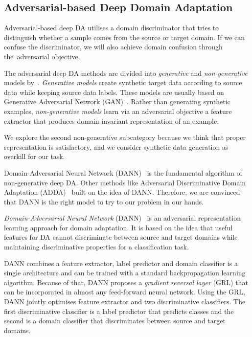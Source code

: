 \subsection{Adversarial-based Deep Domain Adaptation}
\label{adversarial_da}

Adversarial-based deep DA utilises a domain discriminator
that tries to distinguish whether a sample comes from the source or target domain.
If we can confuse the discriminator,
we will also achieve domain confusion through the~adversarial objective.

The adversarial deep DA methods are divided into \textit{generative} and \textit{non-generative} models by~\cite{wang2018}.
\textit{Generative models} create synthetic target data according to source data while keeping source data labels.
These models are usually based on Generative Adversarial Network (GAN)~\cite{goodfellow2014}.
Rather than generating synthetic examples,
\textit{non-generative models} learn via an adversarial objective a feature extractor
that produces domain invariant representation of an example.

We explore the second non-generative subcategory
because we think that proper representation is satisfactory,
and we consider synthetic data generation as overkill for our task.

Domain-Adversarial Neural Network (DANN)~\cite{ganin2016}
is the fundamental algorithm of non-generative deep DA.
Other methods like Adversarial Discriminative Domain Adaptation (ADDA)~\cite{tzeng2017} built on the idea of DANN.
Therefore, we are convinced that DANN is the right model to try to our problem in our hands.

\textit{Domain-Adversarial Neural Network} (DANN)~\cite{ganin2016} is an adversarial representation learning approach for domain adaptation.
It is based on the idea that useful features for DA
cannot discriminate between source and target domains
while maintaining discriminative properties for a classification task.

DANN combines a feature extractor, label predictor and domain classifier is a single architecture
and can be trained with a standard backpropagation learning algorithm.
Because of that, DANN proposes a \textit{gradient reversal layer} (GRL)
that can be incorporated in almost any feed-forward neural network.
Using the GRL, DANN jointly optimises feature extractor and two discriminative classifiers.
The first discriminative classifier is a label predictor that predicts classes and the second is a domain classifier
that discriminates between source and target domains.

